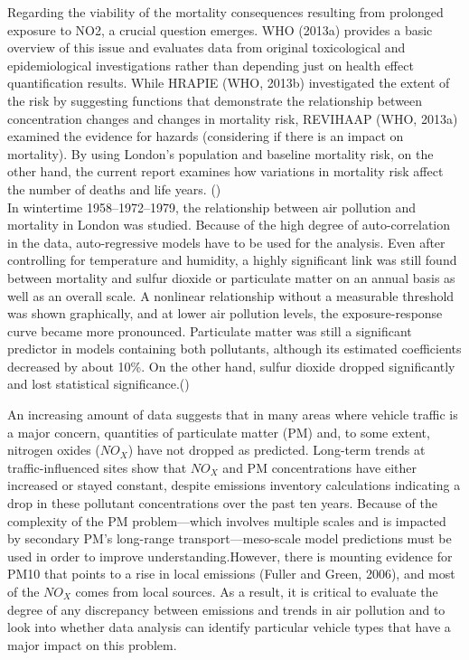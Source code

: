 \documentclass{article}
\begin{document}
	Regarding the viability of the mortality consequences resulting from prolonged exposure to NO2, a crucial question emerges. WHO (2013a) provides a basic overview of this issue and evaluates data from original toxicological and epidemiological investigations rather than depending just on health effect quantification results. While HRAPIE (WHO, 2013b) investigated the extent of the risk by suggesting functions that demonstrate the relationship between concentration changes and changes in mortality risk, REVIHAAP (WHO, 2013a) examined the evidence for hazards (considering if there is an impact on mortality). By using London's population and baseline mortality risk, on the other hand, the current report examines how variations in mortality risk affect the number of deaths and life years.
	(\textcite{health})\\
	
	In wintertime 1958–1972–1979, the relationship between air pollution and mortality in London was studied. Because of the high degree of auto-correlation in the data, auto-regressive models have to be used for the analysis. Even after controlling for temperature and humidity, a highly significant link was still found between mortality and sulfur dioxide or particulate matter on an annual basis as well as an overall scale. A nonlinear relationship without a measurable threshold was shown graphically, and at lower air pollution levels, the exposure-response curve became more pronounced. Particulate matter was still a significant predictor in models containing both pollutants, although its estimated coefficients decreased by about 10\%. On the other hand, sulfur dioxide dropped significantly and lost statistical significance.(\textcite{SCHWARTZ1990})
	\newpage
	
	An increasing amount of data suggests that in many areas where vehicle traffic is a major concern, quantities of particulate matter (PM) and, to some extent, nitrogen oxides ($NO_X$) have not dropped as predicted. Long-term trends at traffic-influenced sites show that $NO_X$ and PM concentrations have either increased or stayed constant, despite emissions inventory calculations indicating a drop in these pollutant concentrations over the past ten years. Because of the complexity of the PM problem—which involves multiple scales and is impacted by secondary PM's long-range transport—meso-scale model predictions must be used in order to improve understanding.However, there is mounting evidence for PM10 that points to a rise in local emissions (Fuller and Green, 2006), and most of the $NO_X$ comes from local sources. As a result, it is critical to evaluate the degree of any discrepancy between emissions and trends in air pollution and to look into whether data analysis can identify particular vehicle types that have a major impact on this problem.
	
\end{document}

